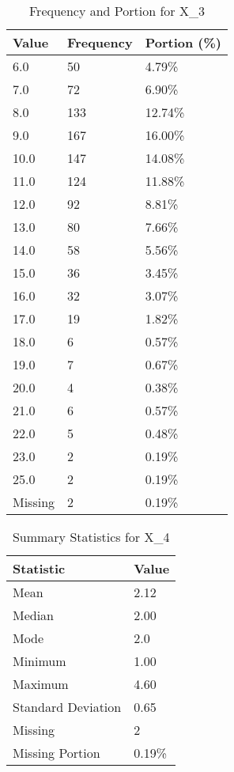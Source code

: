 \begin{table}[H]
\centering
\begin{tabular}{|l|l|l|}
\hline
\textbf{Value} & \textbf{Frequency} & \textbf{Portion (\%)} \\ \hline
6.0 & 50 & 4.79\% \\ \hline
7.0 & 72 & 6.90\% \\ \hline
8.0 & 133 & 12.74\% \\ \hline
9.0 & 167 & 16.00\% \\ \hline
10.0 & 147 & 14.08\% \\ \hline
11.0 & 124 & 11.88\% \\ \hline
12.0 & 92 & 8.81\% \\ \hline
13.0 & 80 & 7.66\% \\ \hline
14.0 & 58 & 5.56\% \\ \hline
15.0 & 36 & 3.45\% \\ \hline
16.0 & 32 & 3.07\% \\ \hline
17.0 & 19 & 1.82\% \\ \hline
18.0 & 6 & 0.57\% \\ \hline
19.0 & 7 & 0.67\% \\ \hline
20.0 & 4 & 0.38\% \\ \hline
21.0 & 6 & 0.57\% \\ \hline
22.0 & 5 & 0.48\% \\ \hline
23.0 & 2 & 0.19\% \\ \hline
25.0 & 2 & 0.19\% \\ \hline
Missing & 2 & 0.19\% \\ \hline
\end{tabular}
\caption{Frequency and Portion for X_3}
\end{table}

\begin{table}[H]
\centering
\begin{tabular}{|l|l|}
\hline
\textbf{Statistic} & \textbf{Value} \\ \hline
Mean               & 2.12 \\ \hline
Median             & 2.00 \\ \hline
Mode               & 2.0 \\ \hline
Minimum            & 1.00 \\ \hline
Maximum            & 4.60 \\ \hline
Standard Deviation & 0.65 \\ \hline
Missing            & 2 \\ \hline
Missing Portion    & 0.19\% \\ \hline
\end{tabular}
\caption{Summary Statistics for X_4}
\end{table}

